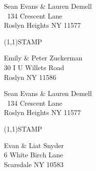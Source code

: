 \documentclass[12pt]{article}
\begin{document}
\begin{minipage}{.5\linewidth} \noindent
Sean Evans \& Lauren Demell\\\ 
134 Crescent Lane\\ 
Roslyn Heights NY 11577
\end{minipage}
\begin{minipage}{.5\linewidth \hspace{-.2in} \vspace{-.3in}}
\begin{flushright}
\framebox(1,1){STAMP}
\end{flushright}
\end{minipage}

\begin{center} \begin{Huge} \vspace*{\fill}
Emily \& Peter Zuckerman\\
30 I U Willets Road\\
Roslyn NY 11586\\
\vspace{\fill} \end{Huge} \end{center}

\clearpage

\begin{minipage}{.5\linewidth} \noindent
Sean Evans \& Lauren Demell\\\ 
134 Crescent Lane\\ 
Roslyn Heights NY 11577
\end{minipage}
\begin{minipage}{.5\linewidth \hspace{-.2in} \vspace{-.3in}}
\begin{flushright}
\framebox(1,1){STAMP}
\end{flushright}
\end{minipage}

\begin{center} \begin{Huge} \vspace*{\fill}
Evan \& Liat Snyder\\
6 White Birch Lane\\
Scarsdale NY 10583\\
\vspace{\fill} \end{Huge} \end{center}

\clearpage
\end{document}
